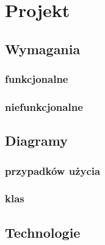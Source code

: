 \documentclass[paper=a4, fontsize=11pt]{scrartcl} %
\begin{document}
\section{Projekt}
\subsection{Wymagania}
\subsubsection{funkcjonalne}
\subsubsection{niefunkcjonalne}

\subsection{Diagramy}
\subsubsection{przypadków użycia}
\subsubsection{klas}

\newpage
\subsection{Technologie}
\end{document}
